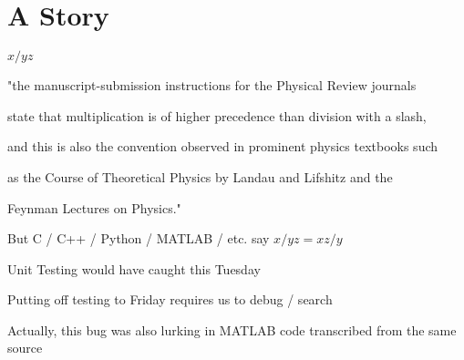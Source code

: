 \documentclass[presentation]{beamer}
\begin{document}
\section{A Story}
\label{sec:orgf49d43b}
\(x/yz\)
\begin{block}{"the manuscript-submission instructions for the Physical Review journals}
\end{block}
\begin{block}{state that multiplication is of higher precedence than division with a slash,}
\end{block}
\begin{block}{and this is also the convention observed in prominent physics textbooks such}
\end{block}
\begin{block}{as the Course of Theoretical Physics by Landau and Lifshitz and the}
\end{block}
\begin{block}{Feynman Lectures on Physics."}
\end{block}
\begin{frame}[label={sec:org67c99f7}]{But C / C++ / Python / MATLAB / etc. say}
\(x/yz = xz/y\)
\end{frame}
\begin{frame}[label={sec:org47dd76c}]{Unit Testing would have caught this Tuesday}
\end{frame}
\begin{frame}[label={sec:org86683d5}]{Putting off testing to Friday requires us to debug / search}
\begin{block}{Actually, this bug was also lurking in MATLAB code transcribed from the same source}
\end{block}
\end{frame}
\end{document}

